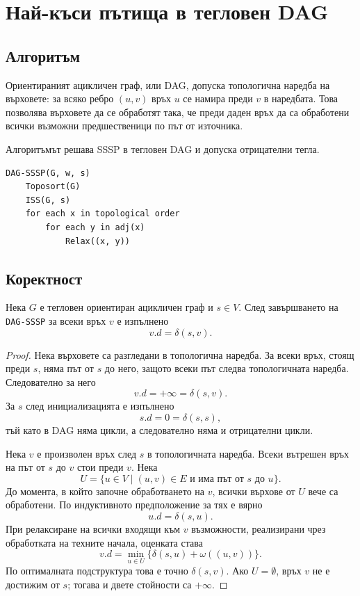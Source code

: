 \section{Най-къси пътища в тегловен DAG}\label{s:8.4}

\subsection{Алгоритъм}\label{s:8.4.1}

Ориентираният ацикличен граф, или DAG, допуска топологична наредба на върховете: за всяко ребро $(u,v)$ връх $u$ се намира преди $v$ в наредбата. Това позволява върховете да се обработят така, че преди даден връх да са обработени всички възможни предшественици по път от източника.

Алгоритъмът решава SSSP в тегловен DAG и допуска отрицателни тегла.

\begin{verbatim}
DAG-SSSP(G, w, s)
    Toposort(G)
    ISS(G, s)
    for each x in topological order
        for each y in adj(x)
            Relax((x, y))
\end{verbatim}

\subsection{Коректност}\label{s:8.4.2}

\begin{keythm}
Нека $G$ е тегловен ориентиран ацикличен граф и $s\in V$. След завършването на \texttt{DAG-SSSP} за всеки връх $v$ е изпълнено
\[
v.d=\delta(s,v).
\]
\end{keythm}

\begin{proof}
Нека върховете са разгледани в топологична наредба. За всеки връх, стоящ преди $s$, няма път от $s$ до него, защото всеки път следва топологичната наредба. Следователно за него
\[
v.d=+\infty=\delta(s,v).
\]
За $s$ след инициализацията е изпълнено
\[
s.d=0=\delta(s,s),
\]
тъй като в DAG няма цикли, а следователно няма и отрицателни цикли.

Нека $v$ е произволен връх след $s$ в топологичната наредба. Всеки вътрешен връх на път от $s$ до $v$ стои преди $v$. Нека
\[
U=\{u\in V\mid (u,v)\in E \text{ и има път от }s\text{ до }u\}.
\]
До момента, в който започне обработването на $v$, всички върхове от $U$ вече са обработени. По индуктивното предположение за тях е вярно
\[
u.d=\delta(s,u).
\]
При релаксиране на всички входящи към $v$ възможности, реализирани чрез обработката на техните начала, оценката става
\[
v.d=\min_{u\in U}\{\delta(s,u)+\omega((u,v))\}.
\]
По оптималната подструктура това е точно $\delta(s,v)$. Ако $U=\emptyset$, връх $v$ не е достижим от $s$; тогава и двете стойности са $+\infty$.
\end{proof}

